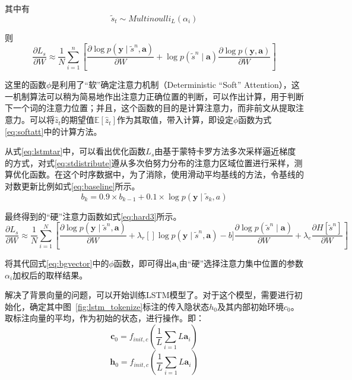 其中有
\begin{equation}
    \tilde{s}_t \sim Multinoulli_L({\alpha_i})
    \label{eq:stdistribute}
\end{equation}

则
\begin{equation}
    \frac{\partial L_s}{\partial W} \approx \frac{1}{N} \sum_{i=1}^{n} [\frac{\partial \log p(\textbf{y}\mid \tilde{s}^n, \textbf{a} )}{\partial W} + \log p(\tilde{s}^n \mid \textbf{a} ) \frac{\partial \log p(\textbf{y}, \textbf{a})}{\partial W} ]
    \label{eq:lstmtar2}
\end{equation}

这里的函数$\phi$是利用了“软”确定注意力机制（Deterministic “Soft” Attention），这一机制算法可以稍为简易地作出注意力正确位置的判断，可以作出计算，用于判断下一个词的注意力位置；并且，这个函数的目的是计算注意力，而非前文从提取注意力。可以将$\hat{z}_t$的期望值$\mathbb{E} [\hat{z}_t]$作为其取值，带入计算，即设定$\phi$函数为式\eqref{eq:softatt}中的计算方法。

从式\eqref{eq:lstmtar}中，可以看出优化函数$L_s$由基于蒙特卡罗方法多次采样逼近梯度的方式，对式\eqref{eq:stdistribute}遵从多次伯努力分布的注意力区域位置进行采样，测算优化函数。在这个时序数据中，为了消除，使用滑动平均基线的方法，令基线的对数更新比例如式\eqref{eq:baseline}所示。
\begin{equation}
    \label{eq:baseline}
    b_k = 0.9 \times b_{k-1} + 0.1 \times \log p(\textbf{y} \mid \tilde{s}_k, a)
\end{equation}

最终得到的“硬”注意力函数如式\eqref{eq:hard3}所示。
\begin{equation}
    \frac{\partial L_s}{\partial W} \approx \frac{1}{N} \sum_{i=1}^N\left[\frac{\partial \log p(\textbf{y}\mid \tilde{s}^n,\textbf{a})}{\partial W} + \lambda_r[]\log p(\textbf{y}\mid \tilde{s}^n,\textbf{a})-b] \frac{\partial \log p(\tilde{s}^n \mid \textbf{a})}{\partial W} +\lambda_e\frac{\partial H[\tilde{s}^n]}{\partial W}\right]
    \label{eq:hard3}
\end{equation}

将其代回式\eqref{eq:bgvector}中的$\phi$函数，即可得出${\textbf{a}_i}$由“硬”选择注意力集中位置的参数${\alpha_i}$加权后的取样结果。

解决了背景向量的问题，可以开始训练LSTM模型了。对于这个模型，需要进行初始化，确定其中图~\ref{fig:lstm_tokenize}标注的传入隐状态$h_0$及其内部初始环境$c_0$。取标注向量的平均，作为初始的状态，进行操作。即：
$$\textbf{c}_0 = f_{init,c}\left(\frac{1}{L}\sum_{i=1}{L}\textbf{a}_i\right)$$
$$\textbf{h}_0 = f_{init,c}\left(\frac{1}{L}\sum_{i=1}{L}\textbf{a}_i\right)$$



